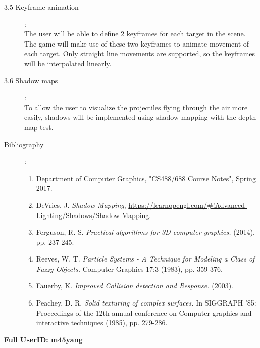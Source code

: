 \documentclass {article}
\begin{document}
\begin{description}
\item[3.5 Keyframe animation]: \\
The user will be able to define 2 keyframes for each target in the scene. The game will make use of these two keyframes to animate movement of each target. Only straight line movements are supported, so the keyframes will be interpolated linearly. \medskip

\item[3.6 Shadow maps]: \\
To allow the user to visualize the projectiles flying through the air more easily, shadows will be implemented using shadow mapping with the depth map test.


\item[Bibliography]:\\

\begin{enumerate}

\item
Department of Computer Graphics, "CS488/688 Course Notes", Spring 2017. \medskip

\item
DeVries, J. {\it Shadow Mapping}, \href{https://learnopengl.com/#!Advanced-Lighting/Shadows/Shadow-Mapping}{https://learnopengl.com/\#!Advanced-Lighting/Shadows/Shadow-Mapping}. \medskip

\item
Ferguson, R. S. {\it Practical algorithms for 3D computer graphics.} (2014), pp. 237-245. \medskip

\item
Reeves, W. T. {\it Particle Systems - A Technique for Modeling a Class of Fuzzy Objects.} Computer Graphics 17:3 (1983), pp. 359-376. \medskip

\item
Fauerby, K. {\it Improved Collision detection and Response.} (2003). \medskip

\item
Peachey, D. R. {\it Solid texturing of complex surfaces.} In SIGGRAPH ’85: Proceedings of the 12th
annual conference on Computer graphics and interactive techniques (1985),
pp. 279-286. \medskip

\end{enumerate}


\end{description}
\newpage


 \bigskip

{\bf Full UserID: m45yang} \medskip 
\end{document}
